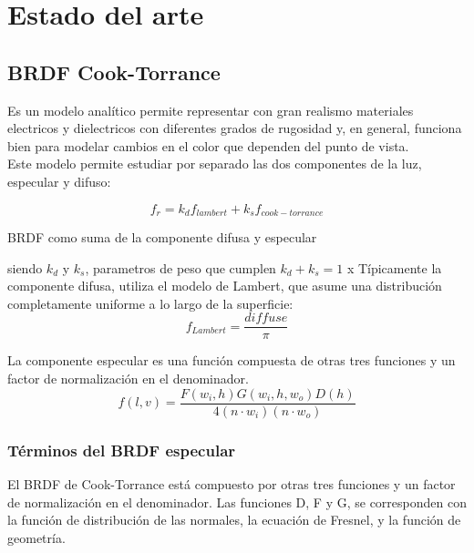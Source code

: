 \chapter{Estado del arte}

\section{BRDF Cook-Torrance}
Es un modelo anal\'itico permite representar con gran realismo materiales electricos y dielectricos con diferentes
grados de rugosidad y, en general, funciona bien para modelar cambios en el color que dependen del punto de vista.\\
Este modelo permite estudiar por separado las dos componentes de la luz, especular y difuso:

\begin{eqfloat}[!htb]
    \begin{equation}
        f_r = k_{d}f_{lambert} + k_sf_{cook-torrance}
    \end{equation}
    \caption{BRDF como suma de la componente difusa y especular}
\end{eqfloat}

siendo $k_d$ y $k_s$, parametros de peso que cumplen $k_d + k_s = 1$
\singlespacing
x
T\'ipicamente la componente difusa, utiliza el modelo de Lambert, que asume una distribuci\'on completamente uniforme a lo
largo de la superficie:\\

\begin{equation}
f_{Lambert} = \frac{diffuse}{\pi}
\end{equation}
\singlespacing

La componente especular es una funci\'on compuesta de otras tres funciones y un factor de normalizaci\'on en el
denominador.\\

\begin{equation}
    f(l, v) = \frac{F(w_i, h) G(w_i, h, w_o) D(h)} {4(n\cdot{w_i}) (n \cdot{w_o})}
\end{equation}
\singlespacing

    \subsection{T\'erminos del BRDF especular}
        El BRDF de Cook-Torrance est\'a compuesto por otras tres funciones y un factor de normalizaci\'on en el denominador.
        Las funciones D, F y G, se corresponden con la funci\'on de distribuci\'on de las normales, la ecuaci\'on de Fresnel,
        y la funci\'on de geometr\'ia.\\

